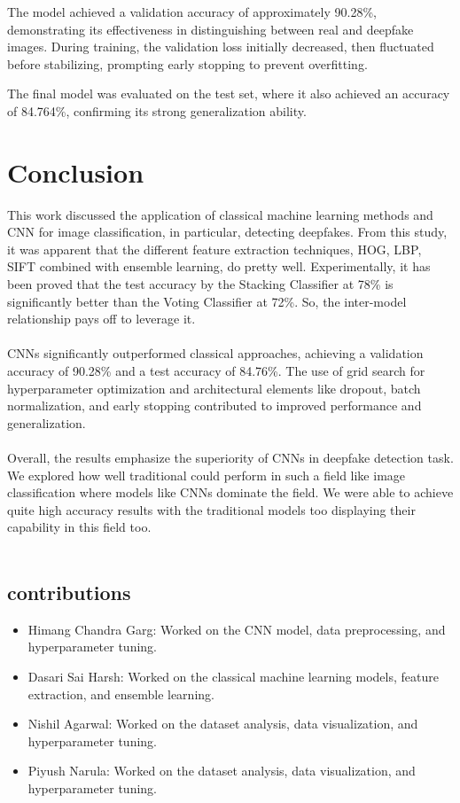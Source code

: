 \documentclass[10pt,twocolumn,letterpaper]{article}
\begin{document}
The model achieved a validation accuracy of approximately 90.28\%, demonstrating its effectiveness in distinguishing between real and deepfake images. During training, the validation loss initially decreased, then fluctuated before stabilizing, prompting early stopping to prevent overfitting. 

The final model was evaluated on the test set, where it also achieved an accuracy of 84.764\%, confirming its strong generalization ability.


\section{Conclusion}

This work discussed the application of classical machine learning methods and CNN for image classification, in particular, detecting deepfakes. From this study, it was apparent that the different feature extraction techniques, HOG, LBP, SIFT combined with ensemble learning, do pretty well. Experimentally, it has been proved that the test accuracy by the Stacking Classifier at 78\% is significantly better than the Voting Classifier at 72\%. So, the inter-model relationship pays off to leverage it.
\\\\
CNNs significantly outperformed classical approaches, achieving a validation accuracy of 90.28\% and a test accuracy of 84.76\%. The use of grid search for hyperparameter optimization and architectural elements like dropout, batch normalization, and early stopping contributed to improved performance and generalization.
\\\\
Overall, the results emphasize the superiority of CNNs in deepfake detection task. We explored how well traditional could perform in such a field like image classification where models like CNNs dominate the field. We were able to achieve quite high accuracy results with the traditional models too displaying their capability in this field too.
\\\\
\subsection{contributions}
\begin{itemize}
    \item Himang Chandra Garg: Worked on the CNN model, data preprocessing, and hyperparameter tuning.
    \item Dasari Sai Harsh: Worked on the classical machine learning models, feature extraction, and ensemble learning.
    \item Nishil Agarwal: Worked on the dataset analysis, data visualization, and hyperparameter tuning.
    \item Piyush Narula: Worked on the dataset analysis, data visualization, and hyperparameter tuning.
\end{itemize}
\end{document}
